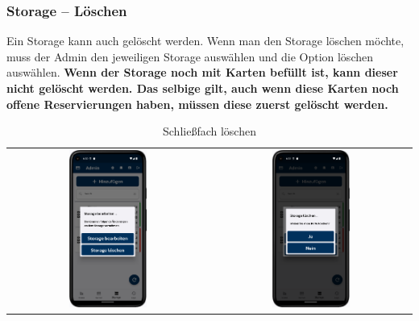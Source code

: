 \newpage

\subsubsection{Storage – Löschen} \label{subsubsec:deleteStorage}
Ein Storage kann auch gelöscht werden. Wenn man den Storage löschen möchte, muss der Admin den jeweiligen Storage auswählen und die Option löschen auswählen. \textbf{Wenn der Storage noch mit Karten befüllt ist, kann dieser nicht gelöscht werden. Das selbige gilt, auch wenn diese Karten noch offene Reservierungen haben, müssen diese zuerst gelöscht werden.}

\vspace{1cm}
\begin{table}[htbp]
  \centering
  \begin{tabular}{cc}
    \includegraphics[width=0.4\textwidth]{FLUTTER/images/ZB/storage_page_selector.png} &
    \includegraphics[width=0.4\textwidth]{FLUTTER/images/ZB/storage_delete_page.png} \\
  \end{tabular}
  \label{tab:example}
  \captionsetup{type=figure}
  \caption{Schließfach löschen}
\end{table}

